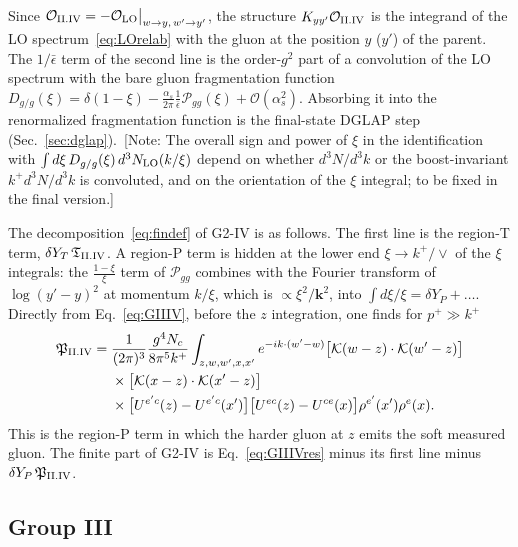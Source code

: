 \documentclass[aps,prd,onecolumn,superscriptaddress,nofootinbib,floatfix,longbibliography,11pt]{revtex4-2}
\numberwithin{equation}{section}
\newif\ifshownotes \shownotestrue
\newcommand{\note}[1]{\ifshownotes{\color{red}\,[\textsf{Note:} #1]}\fi}
\newcommand{\KK}{\mathcal{K}}
\newcommand{\Ord}{\mathcal{O}}
\begin{document}
Since $\Ord_{\rm II.IV}=-\Ord_{\rm LO}\big|_{w\to y,\,w'\to y'}$, the structure $K_{yy'}\Ord_{\rm II.IV}$ is the integrand of the LO spectrum~\eqref{eq:LOrelab} with the gluon at the position $y$ ($y'$) of the parent. The $1/\bar\epsilon$ term of the second line is the order-$g^2$ part of a convolution of the LO spectrum with the bare gluon fragmentation function $D_{g/g}(\xi)=\delta(1-\xi)-\frac{\alpha_s}{2\pi}\frac{1}{\bar\epsilon}\mathcal P_{gg}(\xi)+\Ord(\alpha_s^2)$. Absorbing it into the renormalized fragmentation function is the final-state DGLAP step (Sec.~\ref{sec:dglap}).
\note{The overall sign and power of $\xi$ in the identification with $\int d\xi\,D_{g/g}(\xi)\,d^3N_{\rm LO}(k/\xi)$ depend on whether $d^3N/d^3k$ or the boost-invariant $k^+d^3N/d^3k$ is convoluted, and on the orientation of the $\xi$ integral; to be fixed in the final version.}

The decomposition~\eqref{eq:findef} of G2-IV is as follows. The first line is the region-T term, $\delta Y_T\,\mathfrak T_{\rm II.IV}$. A region-P term is hidden at the lower end $\xi\to k^+/\vee$ of the $\xi$ integrals: the $\frac{1-\xi}{\xi}$ term of $\mathcal P_{gg}$ combines with the Fourier transform of $\log(y'-y)^2$ at momentum $k/\xi$, which is $\propto\xi^2/\mathbf k^2$, into $\int d\xi/\xi=\delta Y_P+\dots$. Directly from Eq.~\eqref{eq:GIIIV}, before the $z$ integration, one finds for $p^+\gg k^+$
\begin{align}
\mathfrak P_{\rm II.IV}={}&\frac{1}{(2\pi)^3}\frac{g^4N_c}{8\pi^5k^+}\int_{z,w,w',x,x'}e^{-ik\cdot(w'-w)}\big[\KK(w-z)\cdot\KK(w'-z)\big]\notag\\
&\times\big[\KK(x-z)\cdot\KK(x'-z)\big]\notag\\
&\times\big[U^{e'c}(z)-U^{e'c}(x')\big]\big[U^{ec}(z)-U^{ce}(x)\big]\rho^{e'}(x')\rho^e(x).
\label{eq:PIIIV}
\end{align}
This is the region-P term in which the harder gluon at $z$ emits the soft measured gluon. The finite part of G2-IV is Eq.~\eqref{eq:GIIIVres} minus its first line minus $\delta Y_P\,\mathfrak P_{\rm II.IV}$.

\subsection{Group III}\label{sec:finiteG3}
\end{document}
